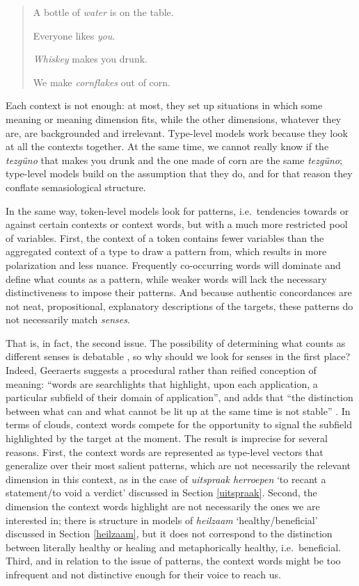 \documentclass[
]{book}
\begin{document}
\begin{quote}
A bottle of \emph{water} is on the table.

Everyone likes \emph{you}.

\emph{Whiskey} makes you drunk.

We make \emph{cornflakes} out of corn.
\end{quote}

Each context is not enough: at most, they set up situations in which some meaning or meaning dimension fits, while the other dimensions, whatever they are, are backgrounded and irrelevant. Type-level models work because they look at all the contexts together. At the same time, we cannot really know if the \emph{tezgüno} that makes you drunk and the one made of corn are the same \emph{tezgüno}; type-level models build on the assumption that they do, and for that reason they conflate semasiological structure.

In the same way, token-level models look for patterns, i.e.~tendencies towards or against certain contexts or context words, but with a much more restricted pool of variables. First, the context of a token contains fewer variables than the aggregated context of a type to draw a pattern from, which results in more polarization and less nuance. Frequently co-occurring words will dominate and define what counts as a pattern, while weaker words will lack the necessary distinctiveness to impose their patterns. And because authentic concordances are not neat, propositional, explanatory descriptions of the targets, these patterns do not necessarily match \emph{senses}.

That is, in fact, the second issue. The possibility of determining what counts as different senses is debatable \autocite{geeraerts_1993,glynn_2014c}, so why should we look for senses in the first place? Indeed, Geeraerts suggests a procedural rather than reified conception of meaning: ``words are searchlights that highlight, upon each application, a particular subfield of their domain of application'', and adds that ``the distinction between what can and what cannot be lit up at the same time is not stable'' \autocite[137]{geeraerts_2006e}. In terms of clouds, context words compete for the opportunity to signal the subfield highlighted by the target at the moment. The result is imprecise for several reasons.
First, the context words are represented as type-level vectors that generalize over their most salient patterns, which are not necessarily the relevant dimension in this context, as in the case of \emph{uitspraak herroepen} `to recant a statement/to void a verdict' discussed in Section \ref{uitspraak}.
Second, the dimension the context words highlight are not necessarily the ones we are interested in; there is structure in models of \emph{heilzaam} `healthy/beneficial' discussed in Section \ref{heilzaam}, but it does not correspond to the distinction between literally healthy or healing and metaphorically healthy, i.e.~beneficial.
Third, and in relation to the issue of patterns, the context words might be too infrequent and not distinctive enough for their voice to reach us.
\end{document}

